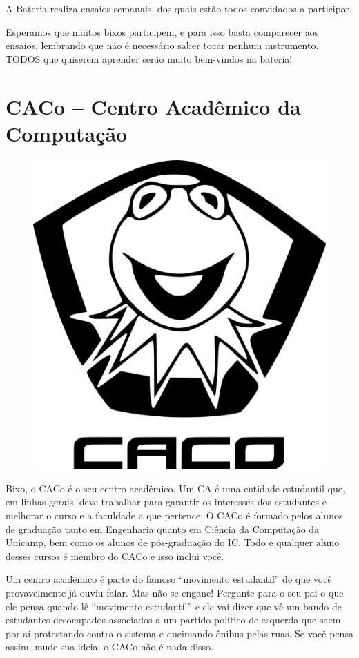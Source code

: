 A Bateria realiza ensaios semanais, dos quais estão todos convidados a
participar.

Esperamos que muitos bixos participem, e para isso basta comparecer aos ensaios,
lembrando que não é necessário saber tocar nenhum instrumento. TODOS que
quiserem aprender serão muito bem-vindos na bateria!

\newpage
\section{CACo -- Centro Acadêmico da Computação}

\begin{figure}[H]
    \centering
    \includegraphics[scale=0.37]{img/caco/logo.png}
\end{figure}

Bixo, o CACo é o seu centro acadêmico. Um CA é uma entidade estudantil que, em
linhas gerais, deve trabalhar para garantir os interesses dos estudantes e
melhorar o curso e a faculdade a que pertence. O CACo é formado pelos alunos
de graduação tanto em Engenharia quanto em Ciência da Computação da Unicamp,
bem como os alunos de pós-graduação do IC. Todo e qualquer aluno desses cursos
é membro do CACo e isso inclui você.

Um centro acadêmico é parte do famoso ``movimento estudantil'' de que você
provavelmente já ouviu falar. Mas não se engane! Pergunte para o seu pai o que ele
pensa quando lê ``movimento estudantil'' e ele vai dizer que vê um bando de
estudantes desocupados associados a um partido político de esquerda que saem por
aí protestando contra o sistema e queimando ônibus pelas ruas. Se você pensa
assim, mude sua ideia: o CACo não é nada disso.

